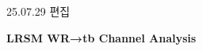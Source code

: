 \documentclass[11pt]{article}
\begin{document}
\begin{center}

\vspace*{1cm}

\hfill{\footnotesize 25.07.29 편집}

\vspace{2cm}

\hfill{} \hspace{0.5cm} 

\vspace{5cm}

{\Huge\textbf{LRSM WR→tb Channel Analysis}}

\end{center}
\end{document}
